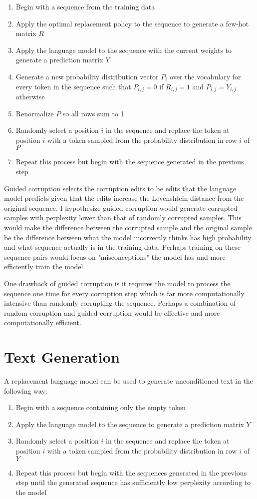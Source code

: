\documentclass{article}
\begin{document}
\begin{enumerate}
    \item {Begin with a sequence from the training data}    
    \item {Apply the optimal replacement policy to the sequence to generate a few-hot matrix $R$}
    \item {Apply the language model to the sequence with the current weights to generate a prediction matrix $Y$}
    \item {Generate a new probability distribution vector $P_i$ over the vocabulary for every token in the sequence such that $P_{i,j} = 0$ if $R_{i,j} = 1$ and $P_{i,j} = Y_{i,j}$ otherwise}
    \item {Renormalize $P$ so all rows sum to 1}
    \item {Randomly select a position $i$ in the sequence and replace the token at position $i$ with a token sampled from the probability distribution in row $i$ of $P$}
    \item {Repeat this process but begin with the sequence generated in the previous step}
\end{enumerate}

Guided corruption selects the corruption edits to be edits that the language model predicts given that the edits increase the Levenshtein distance from the original sequence. I hypothesize guided corruption would generate corrupted samples with perplexity lower than that of randomly corrupted samples. This would make the difference between the corrupted sample and the original sample be the difference between what the model incorrectly thinks has high probability and what sequence actually is in the training data. Perhaps training on these sequence pairs would focus on "misconceptions" the model has and more efficiently train the model. 

One drawback of guided corruption is it requires the model to process the sequence one time for every corruption step which is far more computationally intensive than randomly corrupting the sequence. Perhaps a combination of random corruption and guided corruption would be effective and more computationally efficient.


\section{Text Generation}
A replacement language model can be used to generate unconditioned text in the following way:

\begin{enumerate}
    \item {Begin with a sequence containing only the empty token}
    \item {Apply the language model to the sequence to generate a prediction matrix $Y$}
    \item {Randomly select a position $i$ in the sequence and replace the token at position $i$ with a token sampled from the probability distribution in row $i$ of $Y$}
    \item {Repeat this process but begin with the sequences generated in the previous step until the generated sequence has sufficiently low perplexity according to the model}
\end{enumerate}
\end{document}
